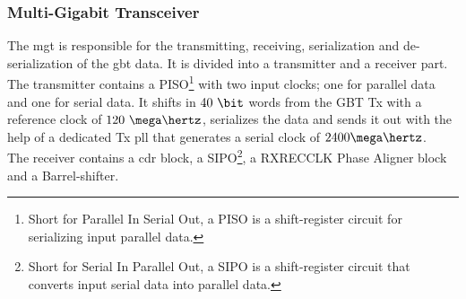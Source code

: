 \documentclass[main.tex]{subfiles}
\begin{document}
\subsubsection{Multi-Gigabit Transceiver}
The \gls{mgt} is responsible for the transmitting, receiving, serialization and de-serialization of the \gls{gbt} data. It is divided into a transmitter and a receiver part.\\ The transmitter contains a PISO\footnote{Short for Parallel In Serial Out, a PISO is a shift-register circuit for serializing input parallel data.} with two input clocks; one for parallel data and one for serial data. It shifts in $40~\bit$ words from the GBT Tx with a reference clock of $120~\mega\hertz$, serializes the data and sends it out with the help of a dedicated Tx \gls{pll} that generates a serial clock of $2400 \mega\hertz$.\\ The receiver contains a \gls{cdr} block, a SIPO\footnote{Short for Serial In Parallel Out, a SIPO is a shift-register circuit that converts input serial data into parallel data.}, a RXRECCLK Phase Aligner block and a Barrel-shifter. 



\end{document}
